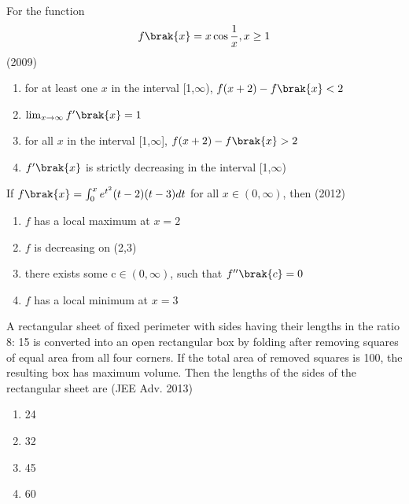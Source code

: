     \item{
        
            For the function $$f\brak{x} = x\cos{\frac{1}{x}}, x\geq1$$
             \hfill
                {(2009)}
            
            \begin{enumerate}
                \item for at least one $x$ in the interval [1,$\infty$), $f(x+2)-f\brak{x}<2$
                \item $\lim_{x\to\infty} f^{\prime}\brak{x} = 1$
                \item for all $x$ in the interval [1,$\infty$], $f(x+2)-f\brak{x}>2$
                \item $f^{\prime}\brak{x}$ is strictly decreasing in the interval [1,$\infty$)
            \end{enumerate}
        
        }
    \item{
        
            If $f\brak{x}= \int_{0}^x e^{t^2}(t-2)(t-3)dt$ for all $x \in(0,\infty)$, then
             \hfill
                {(2012)}
            
            \begin{enumerate}
                \item $f$ has a local maximum at $x=2$ 
                \item $f$ is decreasing on (2,3)
                \item there exists some c$\in(0,\infty)$, such that $f^{\prime\prime}\brak{c}=0$
                \item $f$ has a local minimum at $x=3$
            \end{enumerate}
        
        }
    \item{
    
        
            A rectangular sheet of fixed perimeter with sides having their lengths in the ratio 8: 15 is converted into an open rectangular box by folding after removing squares of equal area from all four corners. If the total area of removed squares is 100, the resulting box has maximum volume. Then the lengths of the sides of the rectangular sheet are
             \hfill
                {(JEE Adv. 2013)}
            \begin{multicols}{2}
                \begin{enumerate}
                    \item 24
                    \item 32
                    \item 45
                    \item 60
                \end{enumerate}
            \end{multicols}

        
        }
